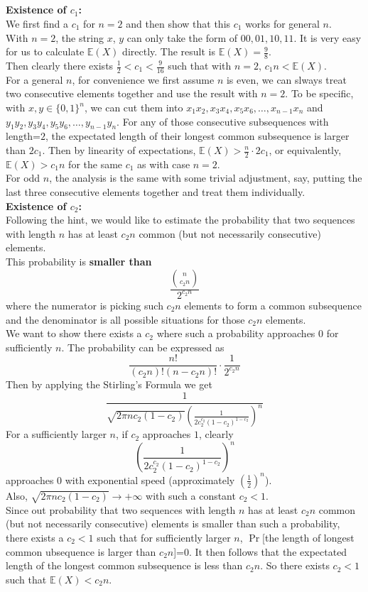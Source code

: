 \documentclass[12pt,letterpaper]{article}
\begin{document}
\subsection{}
\textbf{Existence of $c_1$:}\\
We first find a $c_1$ for $n=2$ and then show that this $c_1$ works for general $n$.\\
With $n=2$, the string $x$, $y$ can only take the form of $00,01,10,11$.
It is very easy for us to calculate $\mathbb{E}(X)$ directly.
The result is $\mathbb{E}(X)=\frac{9}{8}$.\\
Then clearly there exists $\frac{1}{2}<c_1<\frac{9}{16}$ such that with $n=2$, $c_1n<\mathbb{E}(X)$.\\
For a general $n$, for convenience we first assume $n$ is even,
we can slways treat two consecutive elements together and use the result with $n=2$.
To be specific, with $x,y\in\{0,1\}^{n}$,
we can cut them into $x_1x_2,x_3x_4,x_5x_6,\dots,x_{n-1}x_n$ and $y_1y_2,y_3y_4,y_5y_6,\dots,y_{n-1}y_n$.
For any of those consecutive subsequences with length=$2$,
the expectated length of their longest common subsequence is larger than $2c_1$.
Then by linearity of expectations, $\mathbb{E}(X)>\frac{n}{2}\cdot 2c_1$,
or equivalently, $\mathbb{E}(X)>c_1n$ for the same $c_1$ as with case $n=2$.\\
For odd $n$, the analysis is the same with some trivial adjustment, say, 
putting the last three consecutive elements together and treat them individually.\\
\textbf{Existence of $c_2$:}\\
Following the hint, we would like to estimate the probability that 
two sequences with length $n$ has at least $c_2n$ common (but not necessarily consecutive) elements.\\
This probability is \textbf{smaller than}
$$\frac{\binom{n}{c_2n}}{2^{c_2n}}$$
where the numerator is picking such $c_2n$ elements to form a common subsequence
and the denominator is all possible situations for those $c_2n$ elements.\\
We want to show there exists a $c_2$ where such a probability approaches $0$ for sufficiently $n$.
The probability can be expressed as 
$$\frac{n!}{(c_2n)!(n-c_2n)!}\cdot\frac{1}{2^{c_2n}}$$
Then by applying the Stirling's Formula we get 
$$\frac{1}{\sqrt{2\pi nc_2(1-c_2)}\left(\frac{1}{2c_{2}^{c_2}(1-c_2)^{1-c_2}}\right)^n}$$
For a sufficiently larger $n$, 
if $c_2$ approaches $1$, clearly
$$\left(\frac{1}{2c_{2}^{c_2}(1-c_2)^{1-c_2}}\right)^n$$ 
approaches $0$ with exponential speed (approximately $(\frac{1}{2})^n$).\\
Also, $\sqrt{2\pi n c_2(1-c_2)}\to+\infty$ with such a constant $c_2<1$.\\
Since out probability that two sequences with length $n$ has at least $c_2n$ common (but not necessarily consecutive) elements
is smaller than such a probability,
there exists a $c_2<1$ such that for sufficiently larger $n$, 
$\Pr$[the length of longest common ubsequence is larger than $c_2n$]=0.
It then follows that the expectated length of the longest common subsequence is less than $c_2n$.
So there exists $c_2<1$ such that $\mathbb{E}(X)<c_2n$.
\end{document}
